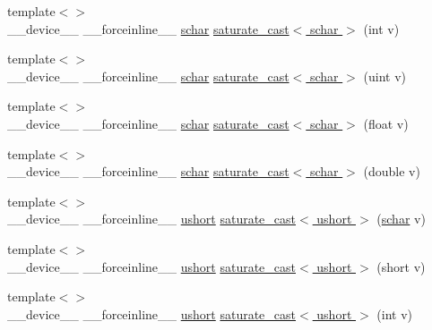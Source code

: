 \begin{DoxyCompactItemize}
\item 
{\footnotesize template$<$$>$ }\\\-\_\-\-\_\-device\-\_\-\-\_\- \-\_\-\-\_\-forceinline\-\_\-\-\_\- \hyperlink{core_2types__c_8h_a0fd9ce9d735064461bebfe6037026093}{schar} \hyperlink{namespacecv_1_1gpu_1_1device_a68d367a1f3ea88e7d3918ad872ba3fdb}{saturate\-\_\-cast$<$ schar $>$} (int v)
\item 
{\footnotesize template$<$$>$ }\\\-\_\-\-\_\-device\-\_\-\-\_\- \-\_\-\-\_\-forceinline\-\_\-\-\_\- \hyperlink{core_2types__c_8h_a0fd9ce9d735064461bebfe6037026093}{schar} \hyperlink{namespacecv_1_1gpu_1_1device_a0f91e3f874de646838f0497c9ed38f85}{saturate\-\_\-cast$<$ schar $>$} (uint v)
\item 
{\footnotesize template$<$$>$ }\\\-\_\-\-\_\-device\-\_\-\-\_\- \-\_\-\-\_\-forceinline\-\_\-\-\_\- \hyperlink{core_2types__c_8h_a0fd9ce9d735064461bebfe6037026093}{schar} \hyperlink{namespacecv_1_1gpu_1_1device_ae13574cfceb743b17b54da628f1bed5f}{saturate\-\_\-cast$<$ schar $>$} (float v)
\item 
{\footnotesize template$<$$>$ }\\\-\_\-\-\_\-device\-\_\-\-\_\- \-\_\-\-\_\-forceinline\-\_\-\-\_\- \hyperlink{core_2types__c_8h_a0fd9ce9d735064461bebfe6037026093}{schar} \hyperlink{namespacecv_1_1gpu_1_1device_abf1c74a96a41e2e8a0047a306e688925}{saturate\-\_\-cast$<$ schar $>$} (double v)
\item 
{\footnotesize template$<$$>$ }\\\-\_\-\-\_\-device\-\_\-\-\_\- \-\_\-\-\_\-forceinline\-\_\-\-\_\- \hyperlink{core_2types__c_8h_ab95f123a6c9bcfee6a343170ef8c5f69}{ushort} \hyperlink{namespacecv_1_1gpu_1_1device_a0cb5a9728c1f25b00675f035d5888dc0}{saturate\-\_\-cast$<$ ushort $>$} (\hyperlink{core_2types__c_8h_a0fd9ce9d735064461bebfe6037026093}{schar} v)
\item 
{\footnotesize template$<$$>$ }\\\-\_\-\-\_\-device\-\_\-\-\_\- \-\_\-\-\_\-forceinline\-\_\-\-\_\- \hyperlink{core_2types__c_8h_ab95f123a6c9bcfee6a343170ef8c5f69}{ushort} \hyperlink{namespacecv_1_1gpu_1_1device_a4c4204993a4ee41f52d80f32f7107867}{saturate\-\_\-cast$<$ ushort $>$} (short v)
\item 
{\footnotesize template$<$$>$ }\\\-\_\-\-\_\-device\-\_\-\-\_\- \-\_\-\-\_\-forceinline\-\_\-\-\_\- \hyperlink{core_2types__c_8h_ab95f123a6c9bcfee6a343170ef8c5f69}{ushort} \hyperlink{namespacecv_1_1gpu_1_1device_a8d2ce60f36ec24d3238fd34bf527235f}{saturate\-\_\-cast$<$ ushort $>$} (int v)

\end{DoxyCompactItemize}
